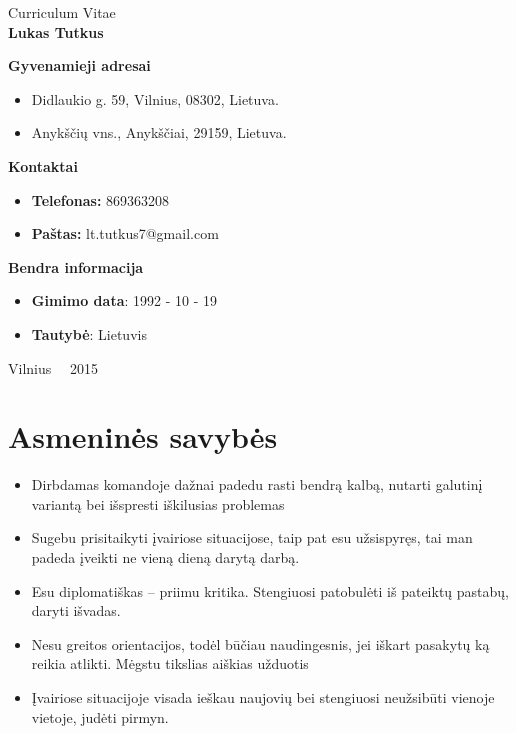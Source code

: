 \documentclass[a4paper,12pt]{article}
\begin{document}
\graphicspath{ {/} }

\renewcommand{\cftdot}{.}	
\renewcommand{\cftsecleader}{\cftdotfill{\cftdotsep}}

\thispagestyle{empty} %


\begin{center}
 Curriculum Vitae\\
\textbf{Lukas Tutkus} \\

\vspace{5cm}

\textbf{Gyvenamieji adresai}
\begin{itemize}
	\item Didlaukio g. 59, Vilnius, 08302, Lietuva. 
	\item Anykščių vns., Anykščiai, 29159, Lietuva.
\end{itemize}

\textbf{Kontaktai}
\begin{itemize}
	\item \textbf{Telefonas:} 869363208
	\item \textbf{Paštas:} lt.tutkus7@gmail.com
\end{itemize}

\textbf{Bendra informacija}
\begin{itemize}
	\item \textbf{Gimimo data}: 1992 - 10 - 19
	\item \textbf{Tautybė}: Lietuvis
\end{itemize}
\vfill

Vilnius \ \  2015
\end{center}



\clearpage

\section{Asmeninės savybės}
\begin{itemize}
	\item Dirbdamas komandoje dažnai padedu rasti bendrą kalbą, nutarti galutinį variantą bei išspresti iškilusias problemas
	\item Sugebu prisitaikyti įvairiose situacijose, taip pat esu užsispyręs, tai man padeda įveikti ne vieną dieną darytą darbą.
	\item Esu diplomatiškas – priimu kritika. Stengiuosi patobulėti iš pateiktų pastabų, daryti išvadas.
	\item Nesu greitos orientacijos, todėl būčiau naudingesnis, jei iškart pasakytų ką reikia atlikti. Mėgstu tikslias aiškias užduotis
	\item Įvairiose situacijoje visada ieškau naujovių bei stengiuosi neužsibūti vienoje vietoje, judėti pirmyn.
\end{itemize}
\end{document}
